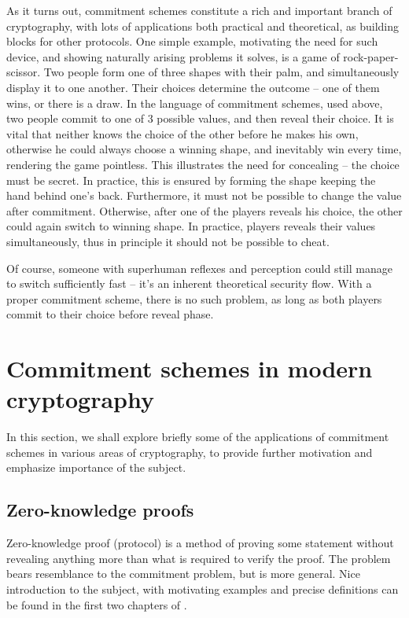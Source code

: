\documentclass[10pt]{article}
\begin{document}
As it turns out, commitment schemes constitute a rich and important branch of cryptography, with lots of
applications both practical and theoretical, as building blocks for other protocols. One simple example,
motivating the need for such device, and showing naturally arising problems it solves, is a game of 
rock-paper-scissor. Two people form one of three shapes with their palm, and simultaneously display it
to one another. Their choices determine the outcome -- one of them wins, or there is a draw. In the
language of commitment schemes, used above, two people commit to one of 3 possible values, and then reveal
their choice. It is vital that neither knows the choice of the other before he makes his own, otherwise
he could always choose a winning shape, and inevitably win every time, rendering the game pointless.
This illustrates the need for concealing -- the choice must be secret. In practice, this is ensured
by forming the shape keeping the hand behind one's back. Furthermore, it must not be possible to change
the value after commitment. Otherwise, after one of the players reveals his choice, the other could again
switch to winning shape. In practice, players reveals their values simultaneously, thus in principle it
should not be possible to cheat.

Of course, someone with superhuman reflexes and perception could still manage to switch sufficiently 
fast -- it's an inherent theoretical security flow. With a proper commitment scheme, there is no
such problem, as long as both players commit to their choice before reveal phase.


\section{Commitment schemes in modern cryptography}

In this section, we shall explore briefly some of the applications of commitment schemes in various
areas of cryptography, to provide further motivation and emphasize importance of the subject.

\subsection{Zero-knowledge proofs}

Zero-knowledge proof (protocol) is a method of proving some statement without revealing anything more
than what is required to verify the proof. The problem bears resemblance to the commitment problem, but
is more general. Nice introduction to the subject, with motivating examples and precise definitions can
be found in the first two chapters of \cite{MIT:StatZero}. 
\end{document}
